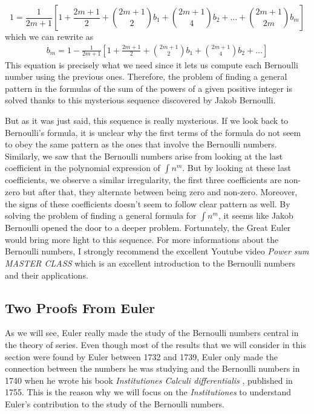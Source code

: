 $$1 = \frac{1}{2m+1}\left[1 + \frac{2m+1}{2} + \binom{2m+1}{2} b_1 + \binom{2m+1}{4}b_2 + \dots + \binom{2m+1}{2m}b_m\right]$$
which we can rewrite as
\begin{align} \label{Bernoulli first recursive formula}
    b_m = 1 - \frac{1}{2m+1}\left[1 + \frac{2m+1}{2} + \binom{2m+1}{2} b_1 + \binom{2m+1}{4}b_2 + \dots \right]
\end{align}
This equation is precisely what we need since it lets us compute each Bernoulli number using the previous ones. Therefore, the problem of finding a general pattern in the formulas of the sum of the powers of a given positive integer is solved thanks to this mysterious sequence discovered by Jakob Bernoulli.

But as it was just said, this sequence is really mysterious. If we look back to Bernoulli's formula, it is unclear why the first terms of the formula do not seem to obey the same pattern as the ones that involve the Bernoulli numbers. Similarly, we saw that the Bernoulli numbers arise from looking at the last coefficient in the polynomial expression of $\int n^m$. But by looking at these last coefficients, we observe a similar irregularity, the first three coefficients are non-zero but after that, they alternate between being zero and non-zero. Moreover, the signs of these coefficients doesn't seem to follow clear pattern as well. By solving the problem of finding a general formula for $\int n^m$, it seems like Jakob Bernoulli opened the door to a deeper problem. Fortunately, the Great Euler would bring more light to this sequence. For more informations about the Bernoulli numbers, I strongly recommend the excellent Youtube video \textit{Power sum MASTER CLASS} \cite{MathologerPowerSum} which is an excellent introduction to the Bernoulli numbers and their applications. 

\subsection*{Two Proofs From Euler}

As we will see, Euler really made the study of the Bernoulli numbers central in the theory of series. Even though most of the results that we will consider in this section were found by Euler between 1732 and 1739, Euler only made the connection between the numbers he was studying and the Bernoulli numbers in 1740 when he wrote his book \textit{Institutiones Calculi differentialis} \cite{euler1755institutiones}, published in 1755. This is the reason why we will focus on the \textit{Institutiones} to understand Euler's contribution to the study of the Bernoulli numbers.

